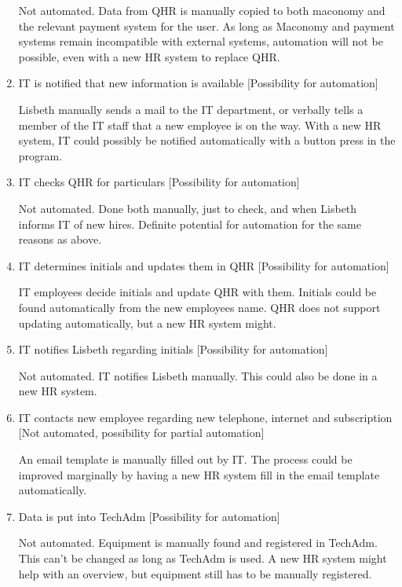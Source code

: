 \begin{enumerate}
		Not automated. Data from QHR is manually copied to both maconomy and the relevant payment system for the user.
		As long as Maconomy and payment systems remain incompatible with external systems, automation will not be possible, even with a new HR system to replace QHR.
	
	\item{IT is notified that new information is available} [Possibility for automation]
	
		Lisbeth manually sends a mail to the IT department, or verbally tells a member of the IT staff that a new employee is on the way.
		With a new HR system, IT could possibly be notified automatically with a button press in the program.		
	
	\item{IT checks QHR for particulars} [Possibility for automation]
	
		Not automated. Done both manually, just to check, and when Lisbeth informs IT of new hires.
		Definite potential for automation for the same reasons as above.
	
	\item{IT determines initials and updates them in QHR} [Possibility for automation]
	
		IT employees decide initials and update QHR with them. Initials could be found automatically from the new employees name. QHR does not support updating automatically, but a new HR system might.
	
	\item{IT notifies Lisbeth regarding initials} [Possibility for automation]
	
		Not automated. IT notifies Lisbeth manually. This could also be done in a new HR system.
	
	\item{IT contacts new employee regarding new telephone, internet and subscription} [Not automated, possibility for partial automation]
	
		An email template is manually filled out by IT. The process could be improved marginally by having a new HR system fill in the email template automatically.
	
	\item{Data is put into TechAdm} [Possibility for automation]
	
		Not automated. Equipment is manually found and registered in TechAdm.
		This can't be changed as long as TechAdm is used. A new HR system might help with an overview, but equipment still has to be manually registered.
	

\end{enumerate}
